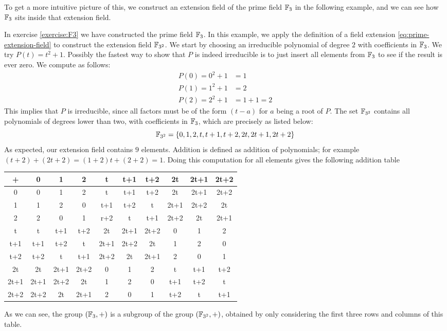 To get a more intuitive picture of this, we construct an extension field of the prime field  $\mathbb{F}_3$ in the following example, and we can see how $\mathbb{F}_3$ sits inside that extension field.
\begin{example}
\label{finite_field_F3_2}
In exercise \ref{exercise:F3} we have constructed the prime field $\mathbb{F}_3$. In this example, we apply the definition of a field extension \ref{eq:prime-extension-field} to construct the extension field $\mathbb{F}_{3^2}$. We start by choosing an irreducible polynomial of degree $2$ with coefficients in $\mathbb{F}_3$. We try
$P(t)=t^2+1$. Possibly the fastest way to show that $P$ is indeed irreducible is to just insert all elements from $\mathbb{F}_3$ to see if the result is ever zero. We compute as follows:
\begin{align*}
P(0) = 0^2+1 &= 1\\
P(1) = 1^2+1 &= 2\\
P(2) = 2^2+1 &=  1+1  = 2
\end{align*}
This implies that $P$ is irreducible, since all factors must be of the form $(t-a)$ for $a$ being a root of $P$. The set $\mathbb{F}_{3^2}$ contains all polynomials of degrees lower than two, with coefficients in $\mathbb{F}_3$, which are precisely as listed below:
$$
\mathbb{F}_{3^2}=\{0,1,2,t,t+1,t+2,2t,2t+1,2t+2\}
$$
As expected, our extension field contains $9$ elements. Addition is  defined as addition of polynomials; for example $(t+2) + (2t+2)= (1+2)t +(2+2)= 1$. Doing this computation for all elements gives the following addition table
\begin{center}
  \begin{tabular}{c | c c c c c c c c c}
    + & 0    & 1    & 2    & t    & t+1  & t+2  & 2t   & 2t+1 & 2t+2 \\\hline
    0 & 0    & 1    & 2    & t    & t+1  & t+2  & 2t   & 2t+1 & 2t+2 \\
    1 & 1    & 2    & 0    & t+1  & t+2  & t    & 2t+1 & 2t+2 & 2t   \\
    2 & 2    & 0    & 1    & r+2  & t    & t+1  & 2t+2 & 2t   & 2t+1 \\
    t & t    & t+1  & t+2  & 2t   & 2t+1 & 2t+2 & 0    & 1    & 2    \\
  t+1 & t+1  & t+2  & t    & 2t+1 & 2t+2 & 2t   & 1    & 2    & 0    \\
  t+2 & t+2  & t    & t+1  & 2t+2 & 2t   & 2t+1 & 2    & 0    & 1    \\
   2t & 2t   & 2t+1 & 2t+2 & 0    & 1    & 2    & t    & t+1  & t+2  \\
 2t+1 & 2t+1 & 2t+2 & 2t   & 1    & 2    & 0    & t+1  & t+2  & t    \\
 2t+2 & 2t+2 & 2t   & 2t+1 & 2    & 0    & 1    & t+2  & t    & t+1
  \end{tabular}
\end{center}
As we can see, the group $(\mathbb{F}_3,+)$ is a subgroup of the group $(\mathbb{F}_{3^2},+)$, obtained by only considering the first three rows and columns of this table.


\end{example}
